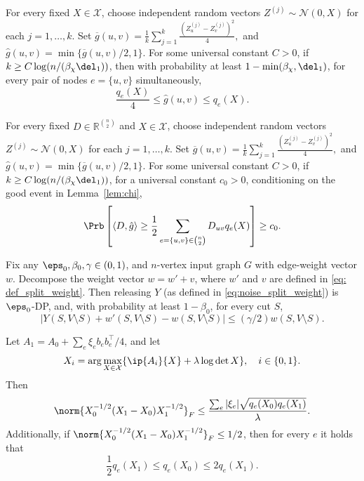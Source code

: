 \begin{lemma}\label{lem:chi}
For every fixed $X \in \mathcal{X}$, choose independent random vectors $Z^{(j)}\sim \mathcal{N}(0,X)$ for each $j=1,\dots,k$. Set $\overline g(u,v)=\frac1k\sum_{j=1}^k\frac{(Z_u^{(j)}-Z_v^{(j)})^2}{4},$ and $\hat g(u,v)=\min\{\overline{g}(u,v)/2,1\}$. For some universal constant $C > 0$, if
$k\geq C\log(n/(\beta_\chi\del_1))$, then with probability at least $1-\min(\beta_\chi, \del_1)$, for every pair of nodes $e=\{u,v\}$ simultaneously,
\[\frac{q_{e}(X)}{4}\leq \hat{g}(u,v)\leq q_{e}(X).\]
\end{lemma}

\begin{lemma}\label{lem:chaos}
For every fixed $D \in \mathbb{R}^{\binom{n}{2}}$ and $X \in \mathcal{X}$, choose independent random vectors $Z^{(j)}\sim \mathcal{N}(0,X)$ for each $j=1,\dots,k$. Set $\overline g(u,v)=\frac1k\sum_{j=1}^k\frac{(Z_u^{(j)}-Z_v^{(j)})^2}{4},$ and $\hat g(u,v)=\min\{\overline{g}(u,v)/2,1\}$.  For some universal constant $C > 0$, if
$k\geq C\log(n/(\beta_\chi\del_1))$, for a universal constant $c_0>0$, conditioning on the good event in Lemma~\ref{lem:chi},
\[
 \Prb\left[\langle D,\hat{g}\rangle\geq\frac{1}{2}\sum_{e=\{u,v\} \in \binom{n}{2}} D_{uv} q_{e}(X)\right]\geq c_0.
\]
\end{lemma}

\begin{lemma}\label{lem:preprocess}
Fix any $\eps_0, \beta_0, \gamma \in (0, 1)$, and $n$-vertex input graph $G$ with edge-weight vector $w$. Decompose the weight vector $w=w'+v$, where $w'$ and $v$ are defined in \eqref{eq: def_split_weight}.
Then releasing $Y$ (as defined in \eqref{eq:noise_split_weight}) is $\eps_0$-DP, and, with probability at least $1-\beta_0$, for every cut $S$,
\[
 |Y(S,V\setminus S)+w'(S,V\setminus S)-w(S,V\setminus S)|\leq(\gamma/2)w(S,V\setminus S).
\]
\end{lemma}

\begin{lemma}\label{lem:stability_of_optimizer}
Let $A_1=A_0+\sum_e\xi_e b_eb_e^\top/4$, and let
\[
 X_i=\arg\max_{X\in\mathcal X}\{\ip{A_i}{X}+\lambda\log\det X\},
 \quad i\in\{0,1\}.
\]
Then
\[\norm{X_0^{-1/2}(X_1-X_0)X_1^{-1/2}}_F\leq \frac{\sum_e|\xi_e|\sqrt{q_e(X_0)q_e(X_1)}}{\lambda}.\]
Additionally, if $\norm{X_0^{-1/2}(X_1-X_0)X_1^{-1/2}}_F\leq1/2$, then for every $e$ it holds that
\[\frac{1}{2}q_e(X_1)\leq q_e(X_0)\leq 2q_e(X_1).\]
\end{lemma}

